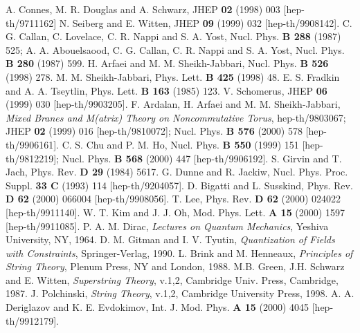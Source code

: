 \documentclass[a4paper]{article}
\begin{document}
\begin{thebibliography}{nn}
\bibitem{} A. Connes, M. R. Douglas and A. Schwarz, 
JHEP {\bf 02} (1998) 003 [hep-th/9711162]
\bibitem{} N. Seiberg and E. Witten,
JHEP {\bf 09} (1999) 032 [hep-th/9908142].
\bibitem{} C. G. Callan, C. Lovelace, C. R. Nappi and S. A. Yost,
Nucl. Phys. {\bf B 288} (1987) 525; A. A. Abouelsaood,  
C. G. Callan, C. R. Nappi and S. A. Yost, 
Nucl. Phys. {\bf B 280} (1987) 599.
\bibitem{} H. Arfaei and M. M. Sheikh-Jabbari,
Nucl. Phys. {\bf B 526} (1998) 278. 
\bibitem{} M. M. Sheikh-Jabbari,  Phys. Lett. {\bf B 425} (1998) 48.
\bibitem{} E. S. Fradkin and A. A. Tseytlin, Phys. Lett. {\bf B 163} 
(1985) 123.
\bibitem{} V. Schomerus, JHEP {\bf 06} (1999) 030 [hep-th/9903205].
\bibitem{} F. Ardalan, H. Arfaei and M. M. Sheikh-Jabbari, 
{\em Mixed Branes and M(atrix) Theory on Noncommutative Torus}, 
hep-th/9803067; JHEP {\bf 02} (1999) 016 [hep-th/9810072]; 
Nucl. Phys. {\bf B 576} (2000) 578 [hep-th/9906161].
\bibitem{} C. S. Chu and P. M. Ho, 
Nucl. Phys. {\bf B 550} (1999) 151 [hep-th/9812219]; 
Nucl. Phys. {\bf B 568} (2000) 447 [hep-th/9906192].
\bibitem{} S. Girvin and T. Jach, Phys. Rev. {\bf D 29} (1984) 5617. 
\bibitem{} G. Dunne and R. Jackiw, Nucl. Phys. Proc. Suppl. 
{\bf 33 C} (1993) 114 [hep-th/9204057]. 
\bibitem{} D. Bigatti and L. Susskind, Phys. Rev. {\bf D 62} (2000)  
066004 [hep-th/9908056].
\bibitem{} T. Lee, Phys. Rev. {\bf D 62} (2000) 024022 [hep-th/9911140].
\bibitem{} W. T. Kim and J. J. Oh, Mod. Phys. Lett. {\bf A 15} (2000) 
1597 [hep-th/9911085].
\bibitem{} P. A. M. Dirac, {\em Lectures on Quantum Mechanics}, 
Yeshiva University, NY, 1964.
\bibitem{} D. M. Gitman and I. V. Tyutin, {\em Quantization of Fields
with Constraints}, Springer-Verlag, 1990.
\bibitem{} L. Brink and M. Henneaux, {\it{Principles of String Theory}},
Plenum Press, NY and London, 1988.
\bibitem{} M.B. Green, J.H. Schwarz and E. Witten,
{\it{Superstring Theory}}, v.1,2, Cambridge Univ. Press, Cambridge, 1987.
\bibitem{} J. Polchinski, {\it{String Theory}}, v.1,2,
Cambridge University Press, 1998.
\bibitem{} A. A. Deriglazov and K. E. Evdokimov, Int. J. Mod. Phys. 
{\bf A 15} (2000) 4045 [hep-th/9912179].
\end{thebibliography}
\end{document}

